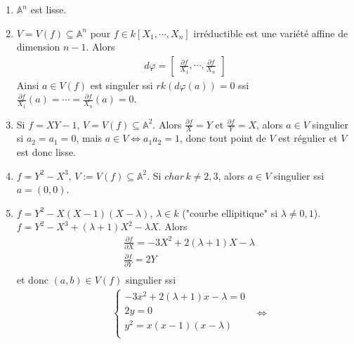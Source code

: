         \begin{expl}
            \begin{enumerate}
                \item $\mathbb{A}^n$ est lisse.
                \item $V = V(f) \subseteq \mathbb{A}^n$ pour $f \in k[X_1, \cdots, X_n]$ irréductible est une variété affine de dimension $n-1$. Alors
                \begin{align*}
                    d \varphi =
                    \begin{bmatrix}
                        \frac{\partial f}{X_1}, \cdots, \frac{\partial f}{X_n}
                    \end{bmatrix}
                \end{align*}
                Ainsi $a \in V(f)$ est singuler ssi $rk (d \varphi(a)) = 0$ ssi $\frac{\partial f}{X_1}(a) = \cdots = \frac{\partial f}{X_n}(a) = 0$.
                \item Si $f = XY - 1$, $V = V(f) \subseteq \mathbb{A}^2$. Alors $\frac{\partial f}{X} = Y$ et $\frac{\partial f}{Y} = X$, alors $a \in V$ singulier si $a_2 = a_1 = 0$, mais $a \in V \iff a_1a_2 = 1$, donc tout point de $V$ est régulier et $V$ est donc lisse.
                \item $f = Y^2 - X^3$, $V := V(f) \subseteq \mathbb{A}^2$. Si $char \, k \neq 2,3$, alors $a \in V$ singulier ssi $a = (0,0)$. 
                \item $f = Y^2 - X(X-1)(X - \lambda)$, $\lambda \in k$ ("courbe ellipitique" si $\lambda \neq 0,1$). $f = Y^2 - X^3 + (\lambda + 1)X^2 - \lambda X$. Alors
                \begin{align*}
                    & \frac{\partial f}{\partial X} = -3X^2 + 2(\lambda + 1)X - \lambda \\
                    & \frac{\partial f}{\partial Y} = 2Y \\
                \end{align*}
                et donc $(a,b) \in V(f)$ singulier ssi
                \begin{align*}
                    &\begin{cases}
                    -3x^2 + 2(\lambda + 1)x - \lambda = 0 \\
                    2y = 0 \\
                    y^2 = x(x-1)(x - \lambda) \\
                    \end{cases}
                    &\iff 

\end{align*}
\end{enumerate}
\end{expl}
